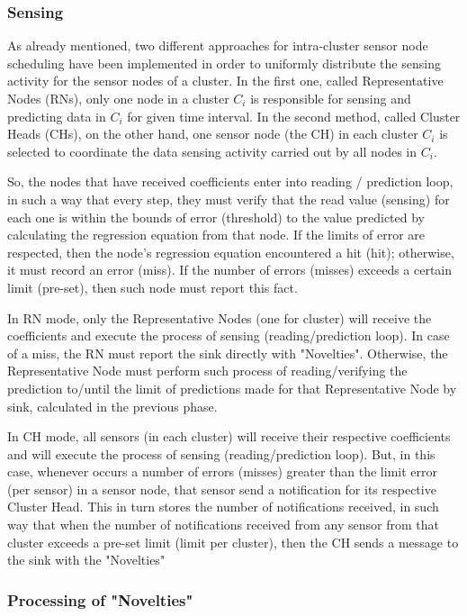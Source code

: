 \documentclass[conference]{IEEEtran}
\begin{document}
\subsubsection{Sensing}

As already mentioned, two different approaches for intra-cluster sensor node
scheduling have been implemented in order to uniformly distribute the sensing
activity for the sensor nodes of a cluster. In the first one, called
Representative Nodes (RNs), only one node in a cluster $C_{i}$ is responsible
for sensing and predicting data in $C_{i}$ for given time interval. In the
second method, called Cluster Heads (CHs), on the other hand, one sensor node
(the CH) in each cluster $C_{i}$ is selected to coordinate the data sensing
activity carried out by all nodes in $C_{i}$.

So, the nodes that have received coefficients enter into reading / prediction
loop, in such a way that every step, they must verify that the read value
(sensing) for each one is within the bounds of error (threshold) to the value
predicted by calculating the regression equation from that node. If the limits
of error are respected, then the node's regression equation encountered a hit
(hit); otherwise, it must record an error (miss). If the number of errors
(misses) exceeds a certain limit (pre-set), then such node must report this fact.



In RN mode, only the Representative Nodes (one for cluster) will receive the
coefficients and execute the process of sensing (reading/prediction loop).
In case of a miss, the RN must report the sink directly with "Novelties".
Otherwise, the Representative Node must perform such process of
reading/verifying the prediction to/until the limit of predictions made for
that Representative Node by sink, calculated in the previous phase.

In CH mode, all sensors (in each cluster) will receive their respective
coefficients and will execute the process of sensing (reading/prediction loop).
But, in this case, whenever occurs a number of errors (misses) greater than the
limit error (per sensor) in a sensor node, that sensor send a
notification for its respective Cluster Head. This in turn stores the number of
notifications received, in such way that when the number of notifications
received from any sensor from that cluster exceeds a pre-set limit (limit per
cluster), then the CH sends a message to the sink with the "Novelties"

\subsubsection{Processing of "Novelties"}
\end{document}
